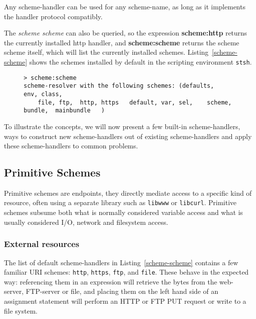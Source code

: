 \documentclass[preprint]{sigplanconf}
\begin{document}
\fussy

 Any scheme-handler
can be used for any scheme-name, as long as it implements the handler protocol
compatibly.


The \emph{scheme scheme} can also be queried,
so the expression {\bf scheme:http} returns the currently installed http handler, and 
{\bf scheme:scheme} returns the scheme scheme itself, which will list the currently
installed schemes.  Listing~\ref{scheme-scheme} shows the schemes installed by
default in the scripting environment {\tt stsh}.

\vspace{-0.5em}
\begin{figure}[htbp]
\begin{lstlisting}[style=numbers,label=scheme-scheme,caption=List of schemes via scheme:scheme.]
> scheme:scheme 
scheme-resolver with the following schemes: (defaults,  env, class,
    file, ftp,  http, https   default, var, sel,    scheme,    bundle,  mainbundle   )
\end{lstlisting}
\end{figure}
\vspace{-0.5em}

To illustrate the concepts, we will now present a few built-in scheme-handlers, ways to construct new
scheme-handlers out of existing scheme-handlers and apply these scheme-handlers to common
problems.

\subsection{Primitive Schemes}
\label{primitiveSchemes}

Primitive schemes are endpoints, they directly
mediate access to a specific kind of resource, often using a separate
library such as {\tt libwww} or {\tt libcurl}.  Primitive schemes
subsume both what is normally considered variable access and 
what is usually considered I/O, network and filesystem access.


\subsubsection{External resources}
\label{externalResources}

The list of default scheme-handlers in Listing~\ref{scheme-scheme} contains a few familiar URI schemes:
{\tt http}, {\tt https}, {\tt ftp}, and {\tt file}.   These behave in the expected way:   referencing them in an expression will
retrieve the bytes from the web-server, FTP-server or file, and placing them on the left hand side of
an assignment statement will perform an HTTP or FTP PUT request or write to a file system. 
 
\end{document}

